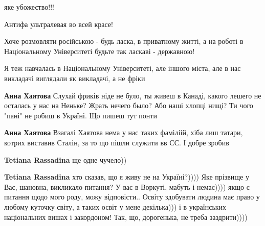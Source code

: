 \begin{itemize}

яке убожество!!!


Антифа ультралевая во всей красе!


Хоче розмовляти російською - будь ласка, в приватному житті, а на роботі в
Національному Університеті будьте так ласкаві - державною!

Я теж навчалась в Національному Університеті, але іншого міста, але в нас
викладачі виглядали як викладачі, а не фріки

\begin{itemize}
\textbf{Анна Хаятова} Слухай фриків ніде не було, ты живеш в Канаді, какого лешего не осталась у нас на Неньке? Жрать нечего было? Або наші хлопці нищі? Ти чого "пані" не робиш в Україні. Що пишеш тут понти


\textbf{Анна Хаятова} Взагалі Хаятова нема у нас таких фаміліій, хіба лиш татари, котрих виставив Сталін, за то що пішли служити вв СС. І добре зробив


\textbf{Tetiana Rassadina} ще одне чучело))


\textbf{Tetiana Rassadina} хто сказав, що я живу не на Україні?)))) Яке прізвище у Вас, шановна, викликало питання? У вас в Воркуті, мабуть і немає)))) якщо є питання щодо мого роду, можу відповісти..
Освіту здобувати людина має право у любому куточку світу, а таких освіт у мене декілька))) і в українських національних вишах і закордоном! Так, що, дорогенька, не треба заздрити))))



\end{itemize}
\end{itemize}
